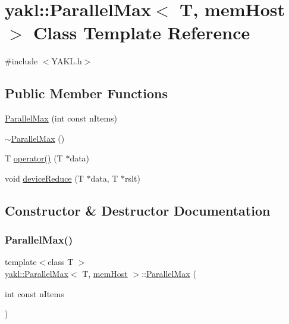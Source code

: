 \hypertarget{classyakl_1_1ParallelMax_3_01T_00_01memHost_01_4}{}\section{yakl\+:\+:Parallel\+Max$<$ T, mem\+Host $>$ Class Template Reference}
\label{classyakl_1_1ParallelMax_3_01T_00_01memHost_01_4}


{\ttfamily \#include $<$Y\+A\+K\+L.\+h$>$}

\subsection*{Public Member Functions}
\begin{DoxyCompactItemize}
\item 
\hyperlink{classyakl_1_1ParallelMax_3_01T_00_01memHost_01_4_a2988a666e8f5e8b2ef1ce84c819b0288}{Parallel\+Max} (int const n\+Items)
\item 
\hyperlink{classyakl_1_1ParallelMax_3_01T_00_01memHost_01_4_a9308aaa172385bbcdee38e71d6420b8c}{$\sim$\+Parallel\+Max} ()
\item 
T \hyperlink{classyakl_1_1ParallelMax_3_01T_00_01memHost_01_4_a1af934fd4b7c2207a3422be6c84889bb}{operator()} (T $\ast$data)
\item 
void \hyperlink{classyakl_1_1ParallelMax_3_01T_00_01memHost_01_4_ac71cce8cf77cb508988d34c80b96fc96}{device\+Reduce} (T $\ast$data, T $\ast$rslt)
\end{DoxyCompactItemize}


\subsection{Constructor \& Destructor Documentation}
\mbox{\label{classyakl_1_1ParallelMax_3_01T_00_01memHost_01_4_a2988a666e8f5e8b2ef1ce84c819b0288}} 
\subsubsection{\texorpdfstring{Parallel\+Max()}{ParallelMax()}}
{\footnotesize\ttfamily template$<$class T $>$ \\
\hyperlink{classyakl_1_1ParallelMax}{yakl\+::\+Parallel\+Max}$<$ T, \hyperlink{namespaceyakl_aae8a8c910fec7cef7db68c9658c16405}{mem\+Host} $>$\+::\hyperlink{classyakl_1_1ParallelMax}{Parallel\+Max} (\begin{DoxyParamCaption}\item[{int const}]{n\+Items }\end{DoxyParamCaption})\hspace{0.3cm}{\ttfamily [inline]}}


